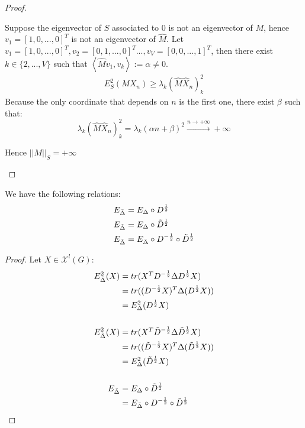 \documentclass[12pt]{article}
\begin{document}
\begin{proof}
\begin{enumerate}
        Suppose the eigenvector of $S$ associated to 0 is not an eigenvector of $M$, hence $v_1 = [1,0,...,0]^T$ is not an eigenvector of $\widehat{M}$. Let $v_1 = [1,0,...,0]^T,v_2 = [0,1,...,0]^T...,v_V = [0,0,...,1]^T$, then there exist $k \in \{2,...,V\}$ such that $\left<\widehat{M} v_1,v_k\right> := \alpha \neq 0$.
        \begin{align*}
            E^2_S(MX_n) \geq \lambda_k (\widehat{M} \widehat{X}_n)^2_k
        \end{align*}
        Because the only coordinate that depends on $n$ is the first one, there exist $\beta$ such that:
        $$
        \lambda_k (\widehat{M} \widehat{X}_n)^2_k = \lambda_k (\alpha n + \beta)^2 \xrightarrow{ n \longrightarrow + \infty} + \infty
        $$

        Hence $\left| \left| M \right| \right|_S = +\infty$
    \end{enumerate}
\end{proof}

\begin{thm}
    We have the following relations:
    \begin{align*}
        E_{\bar{\Delta}} &= E_{\Delta}\circ D^{\frac{1}{2}} \\
        E_{\Tilde{\Delta}} &= E_{\Delta}\circ \Tilde{D}^{\frac{1}{2}}\\
        E_{\Tilde{\Delta}} &= E_{\bar{\Delta}}\circ D^{- \frac{1}{2}} \circ \Tilde{D}^{\frac{1}{2}}\\
    \end{align*}
\end{thm}

\begin{proof}
    Let $X \in \mathcal{X}^l(G)$:
    \begin{align*}
         E^2_{\bar{\Delta}}(X) &= tr(X^T D^{-\frac{1}{2}}\Delta D^{\frac{1}{2}} X)\\
         &= tr((D^{-\frac{1}{2}}X)^T \Delta (D^{\frac{1}{2}} X)) \\
         &= E^2_{\Delta}(D^{\frac{1}{2}} X)\\\\
        E^2_{\Tilde{\Delta}}(X) &= tr(X^T \Tilde{D}^{-\frac{1}{2}}\Delta \Tilde{D}^{\frac{1}{2}} X)\\
         &= tr((\Tilde{D}^{-\frac{1}{2}}X)^T \Delta (\Tilde{D}^{\frac{1}{2}} X)) \\
         &= E^2_{\Delta}(\Tilde{D}^{\frac{1}{2}} X)\\\\
         E_{\Tilde{\Delta}}&= E_{\Delta}\circ \Tilde{D}^{\frac{1}{2}}\\
         &=E_{\bar{\Delta}}\circ D^{- \frac{1}{2}} \circ \Tilde{D}^{\frac{1}{2}}
    \end{align*}
\end{proof}
\end{document}
